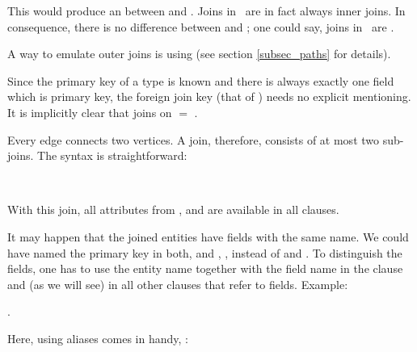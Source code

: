This would produce an  
between  and .
Joins in \nowdb\ are in fact always inner joins.
In consequence, there is no difference between
 and ; one could say,
joins in \nowdb\ are .

A way to emulate outer joins is using 
(see section \ref{subsec_paths} for details).

Since the primary key of a type is known
and there is always exactly one field
which is primary key, the foreign join key
(that of ) needs no
explicit mentioning. It is implicitly clear 
that   
joins on  $=$ .

Every edge connects two vertices.
A join, therefore, consists of at most two sub-joins.
The syntax is straightforward:

\begin{minipage}{\textwidth}
 
    \\
\hspace*{1.9cm}   
\end{minipage}

With this join, all attributes
from ,  and 
are available in all clauses.

It may happen that the joined entities
have fields with the same name.
We could have named the primary key in both,
 and ,
, instead of
 and .
To distinguish the fields,
one has to use the entity name together with the field name
in the  clause and (as we will see) in all
other clauses that refer to fields.
Example:

 .

Here, using aliases comes in handy, \eg:

\begin{minipage}{\textwidth}
   
    
                 \\
\hspace*{2.75cm}   
                               
\end{minipage}

